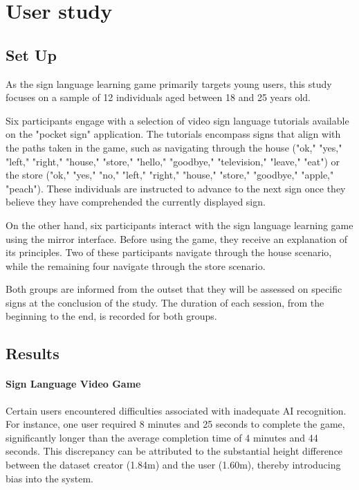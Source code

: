 \section{User study}

\subsection{Set Up}

As the sign language learning game primarily targets young users, this study focuses on a sample of 12 individuals aged between 18 and 25 years old.

Six participants engage with a selection of video sign language tutorials available on the "pocket sign" application. The tutorials encompass signs that align with the paths taken in the game, such as navigating through the house ("ok," "yes," "left," "right," "house," "store," "hello," "goodbye," "television," "leave," "eat") or the store ("ok," "yes," "no," "left," "right," "house," "store," "goodbye," "apple," "peach"). These individuals are instructed to advance to the next sign once they believe they have comprehended the currently displayed sign.

On the other hand, six participants interact with the sign language learning game using the mirror interface. Before using the game, they receive an explanation of its principles. Two of these participants navigate through the house scenario, while the remaining four navigate through the store scenario.

Both groups are informed from the outset that they will be assessed on specific signs at the conclusion of the study. The duration of each session, from the beginning to the end, is recorded for both groups.


\subsection{Results}

\paragraph{Sign Language Video Game}

Certain users encountered difficulties associated with inadequate AI recognition. For instance, one user required 8 minutes and 25 seconds to complete the game, significantly longer than the average completion time of 4 minutes and 44 seconds. This discrepancy can be attributed to the substantial height difference between the dataset creator (1.84m) and the user (1.60m), thereby introducing bias into the system.

